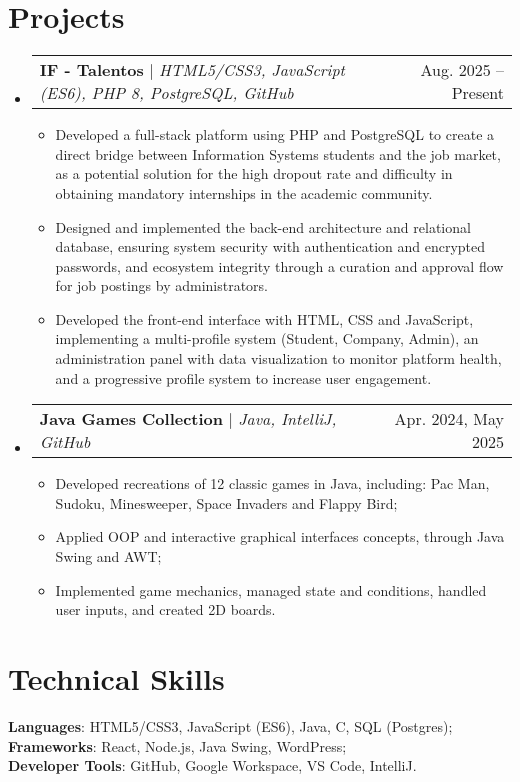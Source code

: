 \documentclass[letterpaper,11pt]{article}
\makeatletter
\newcommand{\resumeItem}[1]{
  \item\small{
    {#1 \vspace{-2pt}}
  }
}
\newcommand{\resumeProjectHeading}[2]{
    \item
    \begin{tabular*}{0.97\textwidth}{l@{\extracolsep{\fill}}r}
      \small#1 & #2 \\
    \end{tabular*}\vspace{-7pt}
}
\newcommand{\resumeSubHeadingListStart}{\begin{itemize}[leftmargin=0.15in, label={}]}
\newcommand{\resumeSubHeadingListEnd}{\end{itemize}}
\newcommand{\resumeItemListStart}{\begin{itemize}}
\newcommand{\resumeItemListEnd}{\end{itemize}\vspace{-5pt}}
\makeatother
\begin{document}
\section{Projects}
    \resumeSubHeadingListStart
      \resumeProjectHeading
          {\textbf{IF - Talentos} $|$ \emph{HTML5/CSS3, JavaScript (ES6), PHP 8, PostgreSQL, GitHub}}{Aug. 2025 -- Present}
          \resumeItemListStart
            \resumeItem{Developed a full-stack platform using PHP and PostgreSQL to create a direct bridge between Information Systems students and the job market, as a potential solution for the high dropout rate and difficulty in obtaining mandatory internships in the academic community.}
            \resumeItem{Designed and implemented the back-end architecture and relational database, ensuring system security with authentication and encrypted passwords, and ecosystem integrity through a curation and approval flow for job postings by administrators.}
            \resumeItem{Developed the front-end interface with HTML, CSS and JavaScript, implementing a multi-profile system (Student, Company, Admin), an administration panel with data visualization to monitor platform health, and a progressive profile system to increase user engagement.}
          \resumeItemListEnd
      \resumeProjectHeading
          {\textbf{Java Games Collection} $|$ \emph{Java, IntelliJ, GitHub}}{Apr. 2024, May 2025}
          \resumeItemListStart
            \resumeItem{Developed recreations of 12 classic games in Java, including: Pac Man, Sudoku, Minesweeper, Space Invaders and Flappy Bird;}
            \resumeItem{Applied OOP and interactive graphical interfaces concepts, through Java Swing and AWT;}
            \resumeItem{Implemented game mechanics, managed state and conditions, handled user inputs, and created 2D boards.}
          \resumeItemListEnd
    \resumeSubHeadingListEnd

\section{Technical Skills}
 \begin{itemize}[leftmargin=0.15in, label={}]
    \small{\item{
     \textbf{Languages}{: HTML5/CSS3, JavaScript (ES6), Java, C, SQL (Postgres);} \\
     \textbf{Frameworks}{: React, Node.js, Java Swing, WordPress;} \\
     \textbf{Developer Tools}{: GitHub, Google Workspace, VS Code, IntelliJ.} \\
     }}
 \end{itemize}

\end{document}
